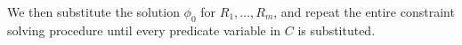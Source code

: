 We then substitute the solution \(\phi_0\) for \(R_1,\dots,R_m\), and 
repeat the entire constraint solving procedure until every predicate 
variable in \(C\) is substituted.  %


%
